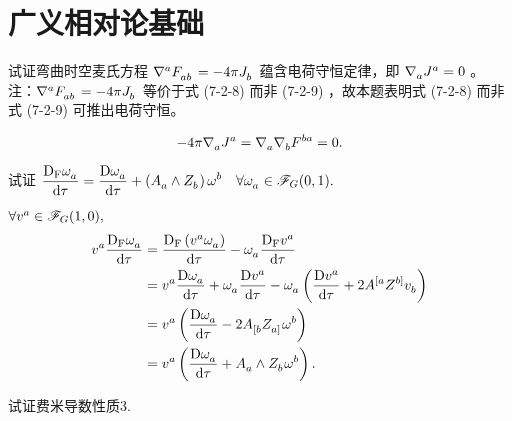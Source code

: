 
\chapter{广义相对论基础}
\begin{xiti}
	\item 试证弯曲时空麦氏方程 $\tensor{\nabla}{^a} \tensor{F}{_a_b} = - 4\pi \tensor{J}{_b}$ 蕴含电荷守恒定律，即 $\Nabla{a} \tensor{J}{^a} = 0$ 。注：$\tensor{\nabla}{^a} \tensor{F}{_a_b} = - 4\pi \tensor{J}{_b}$ 等价于式 (7-2-8) 而非 (7-2-9) ，故本题表明式 (7-2-8) 而非式 (7-2-9) 可推出电荷守恒。
	
	\begin{zm}
		\begin{equation*}
		-4 \pi \Nabla{a} \tensor{J}{^a} = \Nabla{a} \Nabla{b} \tensor{F}{^b^a} = 0.
		\end{equation*}
	\end{zm}
    
    \item 试证 $\displaystyle \Fd{\tensor{\omega}{_a}} = \Dd{\tensor{\omega}{_a}} + \left(\tensor{A}{_a} \wedge \tensor{Z}{_b}\right) \tensor{\omega}{^b} \quad \forall \tensor{\omega}{_a} \in \F_{G}(0,1).$
    
    \begin{zm}
    	$\forall \tensor{v}{^a} \in \F_{G}(1,0),$
    	\begin{align*}
    	    \tensor{v}{^a} \Fd{\tensor{\omega}{_a}} &= \Fd{\left(\tensor{v}{^a}\tensor{\omega}{_a}\right)} - \tensor{\omega}{_a} \Fd{\tensor{v}{^a}}\\
    	    &= \tensor{v}{^a} \Dd{\tensor{\omega}{_a}} + \tensor{\omega}{_a} \Dd{\tensor{v}{^a}} - \tensor{\omega}{_a} \left( \Dd{\tensor{v}{^a}} + 2 \tensor{A}{^{[a}} \tensor{Z}{^{b]}} \tensor{v}{_b} \right)\\
    	    &= \tensor{v}{^a} \left( \Dd{\tensor{\omega}{_a}} - 2 \tensor{A}{_{[b}} \tensor{Z}{_{a]}} \tensor{\omega}{^b} \right)\\
    	    &= \tensor{v}{^a} \left( \Dd{\tensor{\omega}{_a}} + \tensor{A}{_{a}} \wedge \tensor{Z}{_{b}} \tensor{\omega}{^b} \right).
    	\end{align*}
    \end{zm}
    
    \item 试证费米导数性质3.\label{prob-7.3}
    

\end{xiti}
